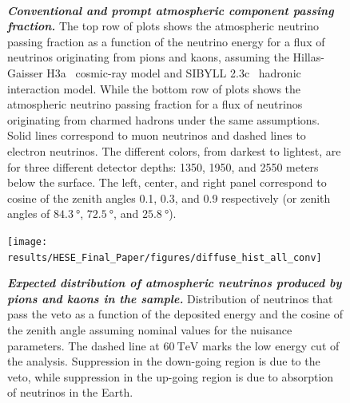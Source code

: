 \begin{figure}
	\centering
	 \\
	\internallinenumbers
	\caption{\textbf{\textit{Conventional and prompt atmospheric component passing fraction.}}
		The top row of plots shows the atmospheric neutrino passing fraction as a function of the neutrino energy for a flux of neutrinos originating from pions and kaons, assuming the Hillas-Gaisser H3a~\cite{Gaisser:2013bla,Gaisser:2011cc,Hillas:2006ms} cosmic-ray model and SIBYLL 2.3c~\cite{Riehn:2017mfm} hadronic interaction model.
		While the bottom row of plots shows the atmospheric neutrino passing fraction for a flux of neutrinos originating from charmed hadrons under the same assumptions.
		Solid lines correspond to muon neutrinos and dashed lines to electron neutrinos.
		The different colors, from darkest to lightest, are for three different detector depths: 1350, 1950, and 2550 meters below the surface.
		The left, center, and right panel correspond to cosine of the zenith angles 0.1, 0.3, and 0.9 respectively (or zenith angles of $\SI{84.3}\degree$, $\SI{72.5}\degree$, and $\SI{25.8}\degree$).}\label{fig:passingfraction}
\end{figure}

\begin{figure}
	\centering
	\texttt{[image: results/HESE\_Final\_Paper/figures/diffuse\_hist\_all\_conv]}
	\internallinenumbers
	\caption{\textbf{\textit{Expected distribution of atmospheric neutrinos produced by pions and kaons in the sample.}} Distribution of neutrinos that pass the veto as a function of the deposited energy and the cosine of the zenith angle assuming nominal values for the nuisance parameters.
		The dashed line at $\SI{60}\TeV$ marks the low energy cut of the analysis.
		Suppression in the down-going region is due to the veto, while suppression in the up-going region is due to absorption of neutrinos in the Earth.}\label{fig:conventional_distribution}
\end{figure}

